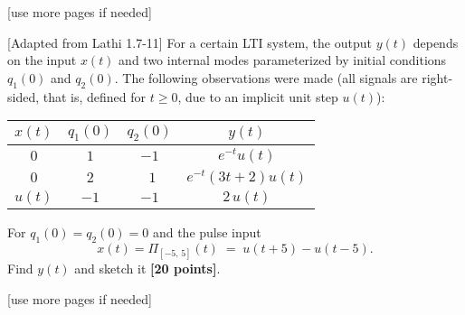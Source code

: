 \documentclass{ee102_pset}
\begin{document}
\vspace*{\fill}
\begin{center}
[use more pages if needed]
\end{center}
[Adapted from Lathi 1.7-11]
For a certain LTI system, the output $y(t)$ depends on the input $x(t)$ and two internal modes parameterized by initial conditions $q_1(0)$ and $q_2(0)$. The following observations were made (all signals are right-sided, that is, defined for $t\geq 0$, due to an implicit unit step $u(t)$):

\begin{center}
\begin{tabular}{c c c c}
\hline
$x(t)$ & $q_1(0)$ & $q_2(0)$ & $y(t)$ \\
\hline
$0$ & $1$ & $-1$ & $e^{-t}u(t)$ \\
$0$ & $2$ & $\ \,1$ & $e^{-t}(3t+2)u(t)$ \\
$u(t)$ & $-1$ & $-1$ & $2\,u(t)$ \\
\hline
\end{tabular}
\end{center}

For $q_1(0)=q_2(0)=0$ and the pulse input
\[
x(t)=\Pi_{[-5,\,5]}(t)\;=\;u(t+5)-u(t-5).
\]
Find $y(t)$ and sketch it \textbf{[20 points]}.

\vspace*{\fill}
\begin{center}
[use more pages if needed]
\end{center}
\end{document}
